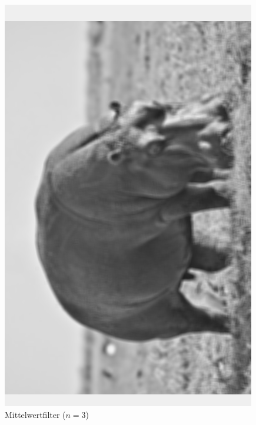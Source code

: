 \documentclass[12pt]{article}
\begin{document}
\begin{figure}[H]
\begin{minipage}{0.49\textwidth}
    \includegraphics[width=\textwidth, height=0.4\textheight, keepaspectratio]{average_3.png}
    Mittelwertfilter ($n = 3$)
  \end{minipage}
\end{figure}
\end{document}
